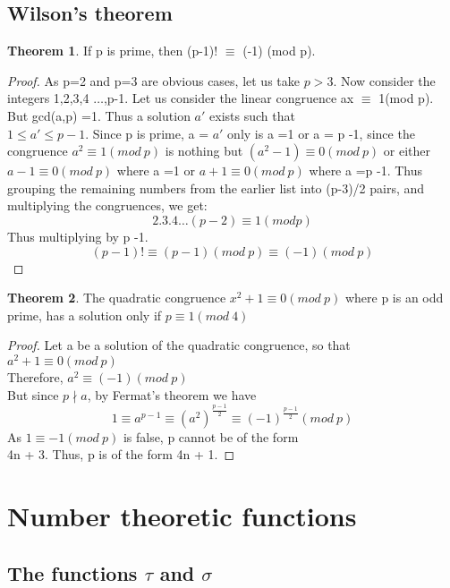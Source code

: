\documentclass[15,a4paper]{report}
\theoremstyle{definition}
\newtheorem{theorem}{Theorem}[section]
\theoremstyle{remark}
\begin{document}
    \section{Wilson's theorem}
        \begin{theorem}
            If p is prime, then (p-1)! $\equiv$ (-1) (mod p).
        \end{theorem}
           \begin{proof}
               As p=2 and p=3 are obvious cases, let us take $p>3$. Now consider the integers 1,2,3,4 $\dots$,p-1.
               Let us consider the linear congruence ax $\equiv$ 1(mod p). But gcd(a,p) =1. Thus a solution $a'$ exists such that\\ $1\leq a' \leq p-1$.
               Since p is prime, a = $a'$ only is a =1 or a = p -1, since the congruence $a^2 \equiv 1(mod ~p)$ is nothing but $(a^2 -1) \equiv 0(mod ~p)$ or either $a - 1 \equiv 0(mod ~p)$ where a =1 or $a +1 \equiv 0(mod ~p)$ where a =p -1.
               Thus grouping the remaining numbers from the earlier list into (p-3)/2 pairs, and multiplying the congruences, we get: \[ 2.3.4\dots (p-2) \equiv 1(mod p) \]
               Thus multiplying by p -1. \[ (p-1)! \equiv (p-1) (mod ~p) \equiv (-1) (mod ~p) \]
            \end{proof}
        \begin{theorem}
            The quadratic congruence $x^2 +1 \equiv 0(mod ~p)$ where p is an odd prime, has a solution only if $p \equiv 1(mod ~4)$ 
        \end{theorem}   
            \begin{proof}
                Let a be a solution of the quadratic congruence, so that $a^2 +1  \equiv 0(mod ~p)$ \\
                Therefore, $a^2 \equiv (-1) (mod ~p)$\\
                But since $p \nmid a$, by Fermat's theorem we have
                \[ 1 \equiv a^{p-1} \equiv (a^2)^{\frac{p-1}{2}} \equiv (-1)^{\frac{p-1}{2}} (mod ~p) \]
                As $1 \equiv -1 (mod ~p)$ is false, p cannot be of the form\\ 4n + 3. Thus, p is of the form 4n + 1.
            \end{proof}


\chapter{Number theoretic functions}
    \section{The functions $\tau $  and $\sigma$}
\end{document}
